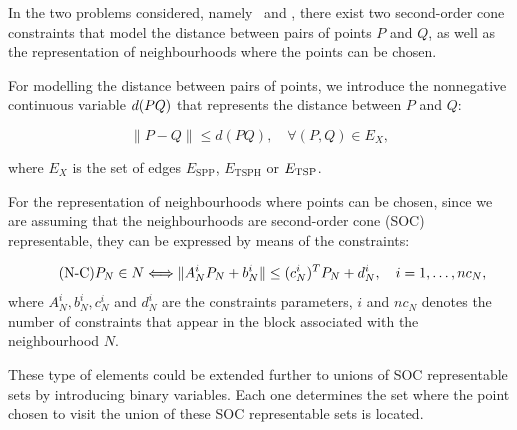 \documentclass[a4paper,  review, authoryear, 1p.]{elsarticle}
\newcommand{\SPPN}{{\sf{H-SPPN}\xspace }}
\newcommand{\TSPN}{{\sf{H-TSPN}\xspace }}
\newcommand{\ESPP}{{E_{\text{SPP}}}}
\newcommand{\ETSPH}{{E_{\text{TSPH}}}}
\begin{document}
	In the two problems considered, namely \SPPN \ and \TSPN, there exist two second-order cone constraints that model the distance between pairs of points $P$ and $Q$, as well as the representation of neighbourhoods where the points can be chosen.
	
	\newcommand{\dvar}[2]{d(#1#2)}
	
	For modelling the distance between pairs of points, we introduce the nonnegative continuous variable $\dvar{PQ}$ that represents the distance between $P$ and $Q$:
	
	
	\begin{equation*}\tag{d-C}\label{eq:dC}
		\|P - Q\|\leq \dvar{P}{Q},\quad\forall (P,Q)\in E_X,
	\end{equation*}
	
	where $E_X$ is the set of edges $\ESPP$, $\ETSPH$ or $E_{\rm{TSP}}$.
	
	For the representation of neighbourhoods where points can be chosen, since we are assuming that the neighbourhoods are second-order cone (SOC) representable, they can be expressed by means of the constraints:
	
	\begin{equation*}\tag{N-C}\label{eq:nC}
		P_N\in N \Longleftrightarrow
		\|A_N^i P_N + b_N^i\| \leq (c_N^i)^T P_N + d_N^i,\quad i=1,\ldots,nc_N, \\
	\end{equation*}
	where $A_N^i, b_N^i, c_N^i$ and $d_N^i$ are the constraints parameters, $i$ and $nc_N$ denotes the number of constraints that appear in the block associated with the neighbourhood $N$.
	
	
	These type of elements could be extended further to unions of SOC representable sets by introducing binary variables. Each one determines the set where the point chosen to visit the union of these SOC representable sets is located.
	
\end{document}
